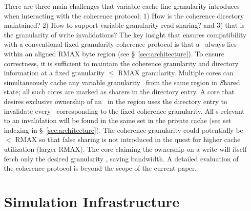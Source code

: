 There are three main challenges that variable cache line granularity introduces when interacting with the coherence protocol: 1) How is the coherence directory maintained? 2) How to support variable granularity read sharing? and 3) that is the granularity of write invalidations? The key insight that ensures compatibility with a conventional
fixed-granularity coherence protocol is that a \AB\ always lies within an aligned RMAX byte region (see \S~\ref{sec:architecture}). To ensure correctness, it is sufficient to maintain the coherence granularity and directory information at a fixed granularity $\leq$ RMAX granularity. Multiple cores can simultaneously cache any variable granularity \AB\ from the same region in \textit{S}hared state; all such cores are marked as sharers in the directory entry. A core that desires exclusive ownership of an \AB\ in the region uses the directory entry to invalidate every \AB\ corresponding to the fixed coherence granularity. All \AB{}s relevant to an invalidation   will be found in the same set in the private cache (see set indexing in \S~\ref{sec:architecture}). The coherence granularity could potentially be $<$ RMAX so that false sharing is not introduced in the quest  for higher cache utilization (larger RMAX). The core claiming the ownership on a write will itself fetch only the desired granularity \AB{}, saving bandwidth. A detailed evaluation of the coherence protocol is beyond the scope of the current paper.

\section{Simulation Infrastructure}

